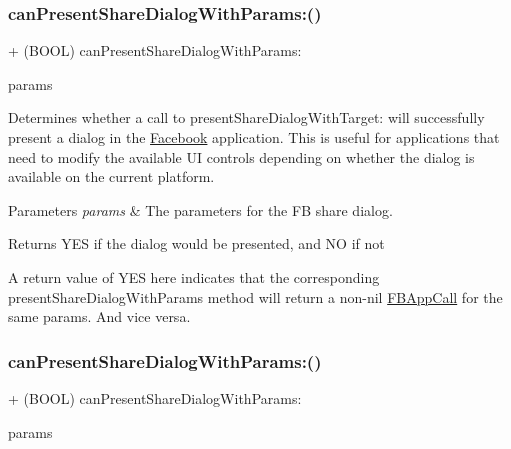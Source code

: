 \subsubsection{\texorpdfstring{can\+Present\+Share\+Dialog\+With\+Params\+:()}{canPresentShareDialogWithParams:()}\hspace{0.1cm}{\footnotesize\ttfamily [1/5]}}
{\footnotesize\ttfamily + (B\+O\+OL) can\+Present\+Share\+Dialog\+With\+Params\+: \begin{DoxyParamCaption}\item[{(\hyperlink{interfaceFBLinkShareParams}{F\+B\+Link\+Share\+Params} $\ast$)}]{params }\end{DoxyParamCaption}}

Determines whether a call to present\+Share\+Dialog\+With\+Target\+: will successfully present a dialog in the \hyperlink{interfaceFacebook}{Facebook} application. This is useful for applications that need to modify the available UI controls depending on whether the dialog is available on the current platform.


\begin{DoxyParams}{Parameters}
{\em params} & The parameters for the FB share dialog.\\
\hline
\end{DoxyParams}
\begin{DoxyReturn}{Returns}
Y\+ES if the dialog would be presented, and NO if not
\end{DoxyReturn}
A return value of Y\+ES here indicates that the corresponding present\+Share\+Dialog\+With\+Params method will return a non-\/nil \hyperlink{interfaceFBAppCall}{F\+B\+App\+Call} for the same params. And vice versa. \mbox{\label{interfaceFBDialogs_a36e9e390bb8c6040e6027b647ed587e8}} 
\subsubsection{\texorpdfstring{can\+Present\+Share\+Dialog\+With\+Params\+:()}{canPresentShareDialogWithParams:()}\hspace{0.1cm}{\footnotesize\ttfamily [2/5]}}
{\footnotesize\ttfamily + (B\+O\+OL) can\+Present\+Share\+Dialog\+With\+Params\+: \begin{DoxyParamCaption}\item[{(\hyperlink{interfaceFBLinkShareParams}{F\+B\+Link\+Share\+Params} $\ast$)}]{params }\end{DoxyParamCaption}}

